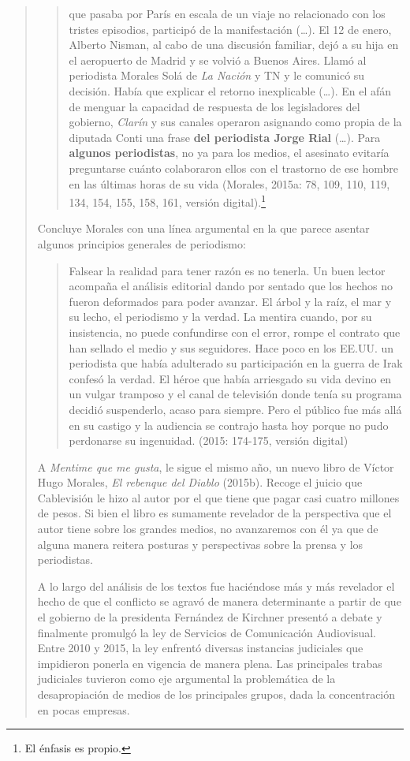 \begin{quote}
\begin{quote}
que pasaba por París en escala de un viaje no relacionado con los tristes episodios, participó de la manifestación (\dots). El 12 de enero, Alberto Nisman, al cabo de una discusión familiar, dejó a su hija en el aeropuerto de Madrid y se volvió a Buenos Aires. Llamó al periodista Morales Solá de \emph{La Nación} y TN y le comunicó su decisión. Había que explicar el retorno inexplicable (\dots). En el afán de menguar la capacidad de respuesta de los legisladores del gobierno, \emph{Clarín} y sus canales operaron asignando como propia de la diputada Conti una frase \textbf{del periodista Jorge Rial} (\dots). Para \textbf{algunos periodistas}, no ya para los medios, el asesinato evitaría preguntarse cuánto colaboraron ellos con el trastorno de ese hombre en las últimas horas de su vida (Morales, 2015a: 78, 109, 110, 119, 134, 154, 155, 158, 161, versión digital).\footnote{El énfasis es propio.}
\end{quote}


Concluye Morales con una línea argumental en la que parece asentar algunos principios generales de periodismo:

\begin{quote}
	Falsear la realidad para tener razón es no tenerla. Un buen lector acompaña el análisis editorial dando por sentado que los hechos no fueron deformados para poder avanzar. El árbol y la raíz, el mar y su lecho, el periodismo y la verdad. La mentira cuando, por su insistencia, no puede confundirse con el error, rompe el contrato que han sellado el medio y sus seguidores. Hace poco en los EE.UU. un periodista que había adulterado su participación en la guerra de Irak confesó la verdad. El héroe que había arriesgado su vida devino en un vulgar tramposo y el canal de televisión donde tenía su programa decidió suspenderlo, acaso para siempre. Pero el público fue más allá en su castigo y la audiencia se contrajo hasta hoy porque no pudo perdonarse su ingenuidad. (2015: 174-175, versión digital)
\end{quote}


A \emph{Mentime que me gusta}, le sigue el mismo año, un nuevo libro de Víctor Hugo Morales, \emph{El rebenque del Diablo} (2015b). Recoge el juicio que Cablevisión le hizo al autor por el que tiene que pagar casi cuatro millones de pesos. Si bien el libro es sumamente revelador de la perspectiva que el autor tiene sobre los grandes medios, no avanzaremos con él ya que de alguna manera reitera posturas y perspectivas sobre la prensa y los periodistas.

A lo largo del análisis de los textos fue haciéndose más y más revelador el hecho de que el conflicto se agravó de manera determinante a partir de que el gobierno de la presidenta Fernández de Kirchner presentó a debate y finalmente promulgó la ley de Servicios de Comunicación Audiovisual. Entre 2010 y 2015, la ley enfrentó diversas instancias judiciales que impidieron ponerla en vigencia de manera plena. Las principales trabas judiciales tuvieron como eje argumental la problemática de la desapropiación de medios de los principales grupos, dada la concentración en pocas empresas.


\end{quote}
